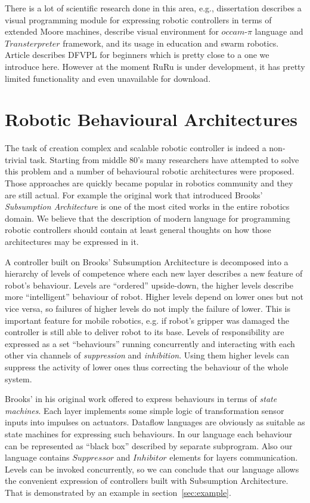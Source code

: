 \documentclass[conference,compsoc]{IEEEtran}
\begin{document}
There is a lot of scientific research done in this area, e.g., dissertation\cite{banyasad2000visual} describes a visual programming module for expressing robotic controllers in terms of extended Moore machines, \cite{simpson2008visual, posso2011process} describe visual environment for $occam\mbox{-}\pi$ language and $Transterpreter$ framework, and its usage in education and swarm robotics. Article\cite{diprose2011ruru} describes DFVPL for beginners which is pretty close to a one we introduce here. However at the moment RuRu is under development, it has pretty limited functionality and even unavailable for download.

\section{Robotic Behavioural Architectures}
\label{sec:Architectures}

The task of creation complex and scalable robotic controller is indeed a non-trivial task. Starting from middle 80's many researchers have attempted to solve this problem and a number of behavioural robotic architectures were proposed\cite{simpson2009toward}. Those approaches are quickly became popular in robotics community and they are still actual. For example the original work that introduced Brooks' \textit{Subsumption Architecture}\cite{brooks1986robust} is one of the most cited works in the entire robotics domain. We believe that the description of modern language for programming robotic controllers should contain at least general thoughts on how those architectures may be expressed in it.

A controller built on Brooks' Subsumption Architecture is decomposed into a hierarchy of levels of competence where each new layer describes a new feature of robot's behaviour. Levels are ``ordered'' upside-down, the higher levels describe more ``intelligent''  behaviour of robot. Higher levels depend on lower ones but not vice versa, so failures of higher levels do not imply the failure of lower. This is important feature for mobile robotics, e.g. if robot's gripper was damaged the controller is still able to deliver robot to its base. Levels of responsibility are expressed as a set ``behaviours'' running concurrently and interacting with each other via channels of \textit{suppression} and \textit{inhibition}. Using them higher levels can suppress the activity of lower ones thus correcting the behaviour of the whole system.

Brooks' in his original work offered to express behaviours in terms of \textit{state machines}. Each layer implements some simple logic of transformation sensor inputs into impulses on actuators. Dataflow languages are obviously as suitable as state machines for expressing such behaviours. In our language each behaviour can be represented as ``black box'' described by separate subprogram. Also our language contains $Suppressor$ and $Inhibitor$ elements for layers communication. Levels can be invoked concurrently, so we can conclude that our language allows the convenient expression of controllers built with Subsumption Architecture. That is demonstrated by an example in section~\ref{sec:example}.
\end{document}
